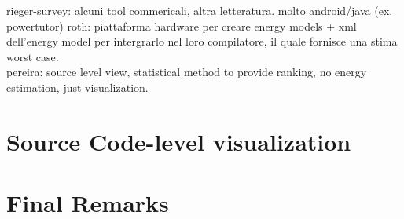 rieger-survey: alcuni tool commericali, altra letteratura. molto android/java (ex. powertutor)
roth: piattaforma hardware per creare energy models + xml dell'energy model per intergrarlo nel loro compilatore, il quale fornisce una stima worst case. \\
pereira: source level view, statistical method to provide ranking, no energy estimation, just visualization. \\

\section{Source Code-level visualization}
\section{Final Remarks}
